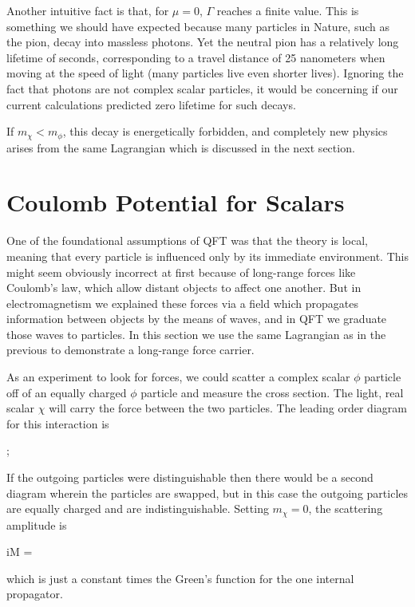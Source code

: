 Another intuitive fact is that, for $\mu = 0$, $\Gamma$ reaches a finite value. This is something we should have expected because many particles in Nature, such as the pion, decay into massless photons. Yet the neutral pion has a relatively long lifetime of seconds, corresponding to a travel distance of 25 nanometers when moving at the speed of light (many particles live even shorter lives). Ignoring the fact that photons are not complex scalar particles, it would be concerning if our current calculations predicted zero lifetime for such decays.

If $m_\chi < m_\phi$, this decay is energetically forbidden, and completely new physics arises from the same Lagrangian which is discussed in the next section.

\section{Coulomb Potential for Scalars}
\label{sec:scalar-coulomb}
One of the foundational assumptions of QFT was that the theory is local, meaning that every particle is influenced only by its immediate environment. This might seem obviously incorrect at first because of long-range forces like Coulomb's law, which allow distant objects to affect one another. But in electromagnetism we explained these forces via a field which propagates information between objects by the means of waves, and in QFT we graduate those waves to particles. In this section we use the same Lagrangian as in the previous to demonstrate a long-range force carrier.

As an experiment to look for forces, we could scatter a complex scalar $\phi$ particle off of an equally charged $\phi$ particle and measure the cross section. The light, real scalar $\chi$ will carry the force between the two particles. The leading order diagram for this interaction is
\begin{center}
  ;
\end{center}
If the outgoing particles were distinguishable then there would be a second diagram wherein the particles are swapped, but in this case the outgoing particles are equally charged and are indistinguishable. Setting $m_\chi=0$, the scattering amplitude is
\begin{e}
  iM = 
\end{e}
which is just a constant times the Green's function for the one internal propagator.

